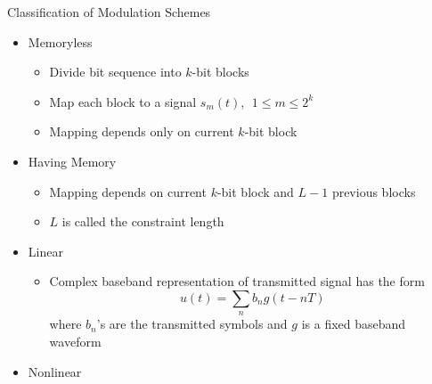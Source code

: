 \documentclass[t]{beamer}
\begin{document}
\begin{frame}{Classification of Modulation Schemes}
  \footnotesize
  \pause
  \begin{itemize}
    \item Memoryless 
      \begin{itemize}
        \footnotesize
        \pause
        \item Divide bit sequence into $k$-bit blocks
        \pause
        \item Map each block to a signal $s_m(t), \ \ 1 \leq m \leq 2^k$
        \pause
        \item Mapping depends only on current $k$-bit block
      \end{itemize}
    \pause
    \item Having Memory 
      \begin{itemize}
        \footnotesize
        \pause
        \item Mapping depends on current $k$-bit block and $L-1$ previous blocks
        \pause
        \item $L$ is called the constraint length
      \end{itemize}
    \pause
    \item Linear 
      \begin{itemize}
        \footnotesize
        \pause
        \item Complex baseband representation of transmitted signal has the form
          \begin{equation*}
            u(t) = \sum_{n} b_n g(t-nT)
          \end{equation*}
          where $b_n$'s are the transmitted symbols and $g$ is a fixed baseband waveform
      \end{itemize}
    \pause
    \item Nonlinear 
  \end{itemize}
  \normalsize
\end{frame}
\end{document}
